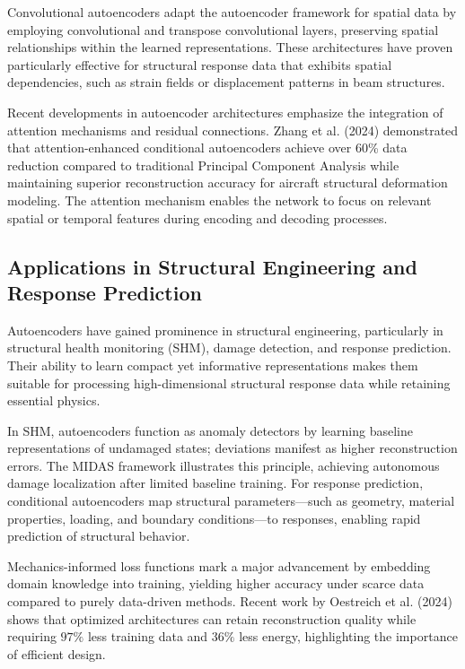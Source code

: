 \documentclass[12pt,a4paper]{report}
\begin{document}
Convolutional autoencoders adapt the autoencoder framework for spatial data by employing convolutional and transpose convolutional layers, preserving spatial relationships within the learned representations. These architectures have proven particularly effective for structural response data that exhibits spatial dependencies, such as strain fields or displacement patterns in beam structures.

Recent developments in autoencoder architectures emphasize the integration of attention mechanisms and residual connections. Zhang et al. (2024) demonstrated that attention-enhanced conditional autoencoders achieve over 60\% data reduction compared to traditional Principal Component Analysis while maintaining superior reconstruction accuracy for aircraft structural deformation modeling. The attention mechanism enables the network to focus on relevant spatial or temporal features during encoding and decoding processes.

\subsection*{Applications in Structural Engineering and Response Prediction}

Autoencoders have gained prominence in structural engineering, particularly in structural health monitoring (SHM), damage detection, and response prediction. Their ability to learn compact yet informative representations makes them suitable for processing high-dimensional structural response data while retaining essential physics.

In SHM, autoencoders function as anomaly detectors by learning baseline representations of undamaged states; deviations manifest as higher reconstruction errors. The MIDAS framework illustrates this principle, achieving autonomous damage localization after limited baseline training. For response prediction, conditional autoencoders map structural parameters---such as geometry, material properties, loading, and boundary conditions---to responses, enabling rapid prediction of structural behavior.

Mechanics-informed loss functions mark a major advancement by embedding domain knowledge into training, yielding higher accuracy under scarce data compared to purely data-driven methods. Recent work by Oestreich et al. (2024) shows that optimized architectures can retain reconstruction quality while requiring $97\%$ less training data and $36\%$ less energy, highlighting the importance of efficient design.
\end{document}
